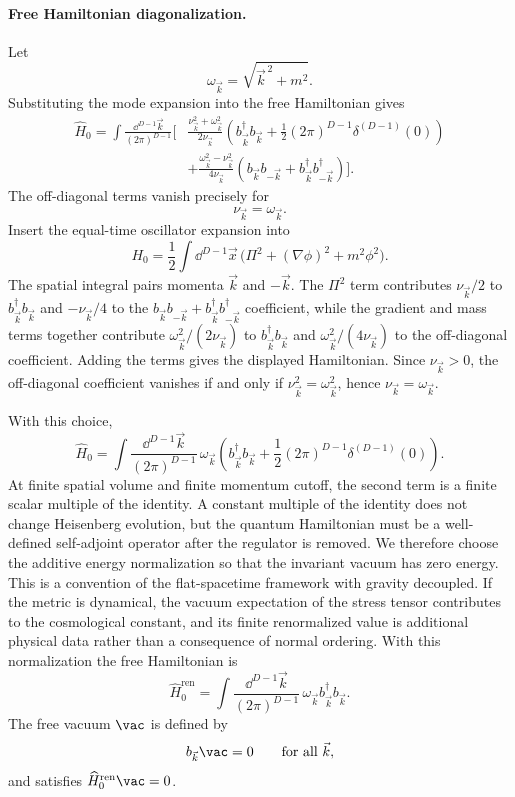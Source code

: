 \paragraph{Free Hamiltonian diagonalization.}
Let
\[
  \omega_{\vec k}=\sqrt{\vec k^{\,2}+m^2}.
\]
Substituting the mode expansion into the free Hamiltonian gives
\[
\begin{aligned}
  \widehat H_0
  =
  \int\frac{\dd^{D-1}\vec k}{(2\pi)^{D-1}}
  \Bigg[
  &\frac{\nu_{\vec k}^2+\omega_{\vec k}^2}{2\nu_{\vec k}}
  \left(
    b^\dagger_{\vec k}b_{\vec k}
    +\frac12(2\pi)^{D-1}\delta^{(D-1)}(0)
  \right)\\
  &+
  \frac{\omega_{\vec k}^2-\nu_{\vec k}^2}{4\nu_{\vec k}}
  \left(
    b_{\vec k}b_{-\vec k}
    +
    b^\dagger_{\vec k}b^\dagger_{-\vec k}
  \right)
  \Bigg].
\end{aligned}
\]
The off-diagonal terms vanish precisely for
\[
  \nu_{\vec k}=\omega_{\vec k}.
\]
Insert the equal-time oscillator expansion into
\[
  H_0=\frac12\int\dd^{D-1}\vec x\,
  \bigl(\Pi^2+(\nabla\phi)^2+m^2\phi^2\bigr).
\]
The spatial integral pairs momenta \(\vec k\) and \(-\vec k\).  The
\(\Pi^2\) term contributes \(\nu_{\vec k}/2\) to
\(b^\dagger_{\vec k}b_{\vec k}\) and \(-\nu_{\vec k}/4\) to the
\(b_{\vec k}b_{-\vec k}+b^\dagger_{\vec k}b^\dagger_{-\vec k}\) coefficient,
while the gradient and mass terms together contribute
\(\omega_{\vec k}^2/(2\nu_{\vec k})\) to
\(b^\dagger_{\vec k}b_{\vec k}\) and
\(\omega_{\vec k}^2/(4\nu_{\vec k})\) to the off-diagonal coefficient.  Adding
the terms gives the displayed Hamiltonian.  Since \(\nu_{\vec k}>0\), the
off-diagonal coefficient vanishes if and only if
\(\nu_{\vec k}^2=\omega_{\vec k}^2\), hence
\(\nu_{\vec k}=\omega_{\vec k}\).

\begin{definition}
\label{def:free-scalar-fock-representation}
With this choice,
\[
  \widehat H_0
  =
  \int\frac{\dd^{D-1}\vec k}{(2\pi)^{D-1}}\,
  \omega_{\vec k}
  \left(
    b^\dagger_{\vec k}b_{\vec k}
    +\frac12(2\pi)^{D-1}\delta^{(D-1)}(0)
  \right).
\]
At finite spatial volume and finite momentum cutoff, the second term is a
finite scalar multiple of the identity. A constant multiple of the identity
does not change Heisenberg evolution, but the quantum Hamiltonian must be a
well-defined self-adjoint operator after the regulator is removed. We
therefore choose the additive energy normalization so that the invariant
vacuum has zero energy. This is a convention of the flat-spacetime framework
with gravity decoupled.  If the metric is dynamical, the vacuum expectation of
the stress tensor contributes to the cosmological constant, and its finite
renormalized value is additional physical data rather than a consequence of
normal ordering. With this normalization the free Hamiltonian is
\[
  \widehat H_0^{\mathrm{ren}}
  =
  \int\frac{\dd^{D-1}\vec k}{(2\pi)^{D-1}}\,
  \omega_{\vec k} b^\dagger_{\vec k}b_{\vec k}.
\]
The free vacuum \(\vac\) is defined by
\[
  b_{\vec k}\vac=0
  \qquad\text{for all }\vec k,
\]
and satisfies \(\widehat H_0^{\mathrm{ren}}\vac=0\).
\end{definition}

